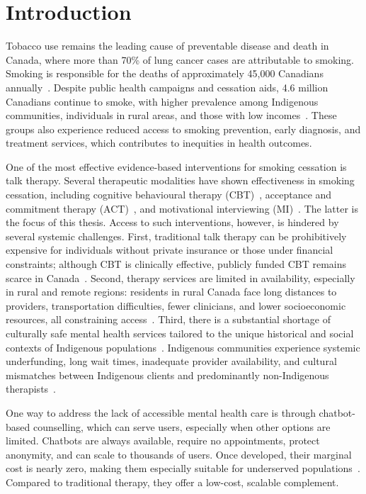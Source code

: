 \chapter{Introduction}

Tobacco use remains the leading cause of preventable disease and death in Canada, where more than 70\% of lung cancer cases are attributable to smoking. Smoking is responsible for the deaths of approximately 45,000 Canadians annually~\cite{poirier2019estimates}. Despite public health campaigns and cessation aids, 4.6 million Canadians continue to smoke, with higher prevalence among Indigenous communities, individuals in rural areas, and those with low incomes~\cite{cpac2020lung}. These groups also experience reduced access to smoking prevention, early diagnosis, and treatment services, which contributes to inequities in health outcomes.

One of the most effective evidence-based interventions for smoking cessation is talk therapy. Several therapeutic modalities have shown effectiveness in smoking cessation, including cognitive behavioural therapy (CBT)~\cite{beck2011cognitive}, acceptance and commitment therapy (ACT)~\cite{hayes1999acceptance}, and motivational interviewing (MI)~\cite{MillerRollnick2023}. The latter is the focus of this thesis. Access to such interventions, however, is hindered by several systemic challenges. First, traditional talk therapy can be prohibitively expensive for individuals without private insurance or those under financial constraints; although CBT is clinically effective, publicly funded CBT remains scarce in Canada~\cite{doi:10.1177/0253717620957496,doi:10.1177/0706743716642416}. Second, therapy services are limited in availability, especially in rural and remote regions: residents in rural Canada face long distances to providers, transportation difficulties, fewer clinicians, and lower socioeconomic resources, all constraining access~\cite{burns2007rural,james2021improving}. Third, there is a substantial shortage of culturally safe mental health services tailored to the unique historical and social contexts of Indigenous populations~\cite{josewski2023improving,hartwasekeesikaw2009cultural}. Indigenous communities experience systemic underfunding, long wait times, inadequate provider availability, and cultural mismatches between Indigenous clients and predominantly non-Indigenous therapists~\cite{turner2018poverty}.


One way to address the lack of accessible mental health care is through chatbot-based counselling, which can serve users, especially when other options are limited. Chatbots are always available, require no appointments, protect anonymity, and can scale to thousands of users. Once developed, their marginal cost is nearly zero, making them especially suitable for underserved populations~\cite{torous2017digital,miner2016smartphone}. Compared to traditional therapy, they offer a low-cost, scalable complement.




